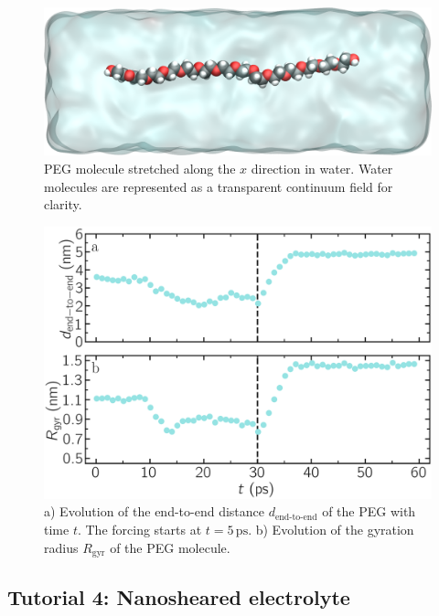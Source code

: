 \documentclass[9pt,tutorial]{livecoms}
\begin{document}
\begin{figure}
\centering
\includegraphics[width=\linewidth]{PEG-in-water}
\caption{PEG molecule stretched along the $x$ direction in water. Water molecules
are represented as a transparent continuum field for clarity.}
\label{fig:PEG-in-water}
\end{figure}

\begin{figure}
\centering
\includegraphics[width=\linewidth]{PEG-distance}
\caption{a) Evolution of the end-to-end distance $d_\text{end-to-end}$ of the
PEG with time $t$. The forcing starts at $t = 5\,\text{ps}$. b) Evolution of
the gyration radius $R_\text{gyr}$ of the PEG molecule.}
\label{fig:PEG-distance}
\end{figure}

\subsection{Tutorial 4: Nanosheared electrolyte}
\label{sheared-confined-label}
\end{document}
